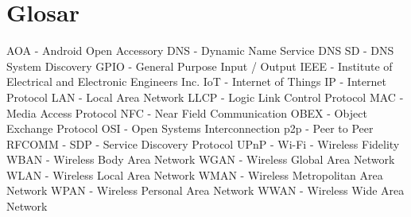 \documentclass[12pt,a4paper]{article}
\begin{document}
    \section{Glosar}
        AOA - Android Open Accessory
        DNS - Dynamic Name Service
        DNS SD - DNS System Discovery
        GPIO - General Purpose Input / Output
        IEEE - Institute of Electrical and Electronic Engineers Inc.
        IoT - Internet of Things
        IP - Internet Protocol
        LAN - Local Area Network
        LLCP - Logic Link Control Protocol
        MAC - Media Access Protocol
        NFC - Near Field Communication
        OBEX - Object Exchange Protocol
        OSI - Open Systems Interconnection
        p2p - Peer to Peer
        RFCOMM - 
        SDP - Service Discovery Protocol
        UPnP - 
        Wi-Fi - Wireless Fidelity
        WBAN - Wireless Body Area Network
        WGAN - Wireless Global Area Network
        WLAN - Wireless Local Area Network
        WMAN - Wireless Metropolitan Area Network
        WPAN - Wireless Personal Area Network
        WWAN - Wireless Wide Area Network
\end{document}
